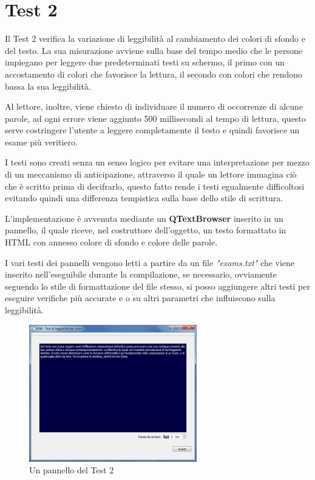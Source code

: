 \documentclass[a4paper]{article}
\begin{document}
\section{Test 2}
Il Test 2 verifica la variazione di leggibilità al cambiamento dei colori di sfondo e del testo.
La sua misurazione avviene sulla base del tempo medio che le persone impiegano per leggere due predeterminati testi su schermo, il primo con un accostamento 
di colori che favorisce la lettura, il secondo con colori che rendono bassa la sua leggibilità.

Al lettore, inoltre, viene chiesto di individuare il numero di occorrenze di alcune parole, ad ogni errore viene aggiunto 500 millisecondi al tempo di lettura,
questo serve costringere l'utente a leggere completamente il testo e quindi favorisce un esame più veritiero.

I testi sono creati senza un senso logico per evitare una interpretazione per mezzo di un meccanismo di anticipazione, attraverso il quale
un lettore immagina ciò che è scritto prima di decifrarlo, questo fatto rende i testi egualmente difficoltosi 
evitando quindi una differenza tempistica sulla base dello stile di scrittura.

L'implementazione è avvenuta mediante un \textbf{QTextBrowser} inserito in un pannello, il quale riceve, nel costruttore dell'oggetto, 
un testo formattato in HTML con annesso colore di sfondo e colore delle parole.

I vari testi dei pannelli vengono letti a partire da un file \textit{"exams.txt"} che viene inserito nell'eseguibile durante la compilazione, se necessario, 
ovviamente seguendo lo stile di formattazione del file stesso, si posso aggiungere altri testi per eseguire verifiche più accurate e o su
altri parametri che influiscono sulla leggibilità.

\begin{figure}[http]
	\centering
	\includegraphics[width=0.65\textwidth]{dialogo1}
	\caption{Un pannello del Test 2}
	\label{figura:dialogo1}
\end{figure}
\end{document}
